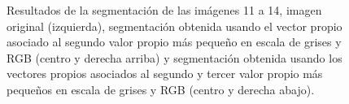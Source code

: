 \documentclass[conference]{IEEEtran}
\begin{document}
\begin{figure}[htbp]
\caption{Resultados de la segmentación de las imágenes 11 a 14, imagen original (izquierda), segmentación obtenida usando el vector propio asociado al segundo valor propio más pequeño en escala de grises y RGB (centro y derecha arriba) y segmentación obtenida usando los vectores propios asociados al segundo y tercer valor propio más pequeños en escala de grises y RGB (centro y derecha abajo).}
\label{res2}
\end{figure}
\end{document}
